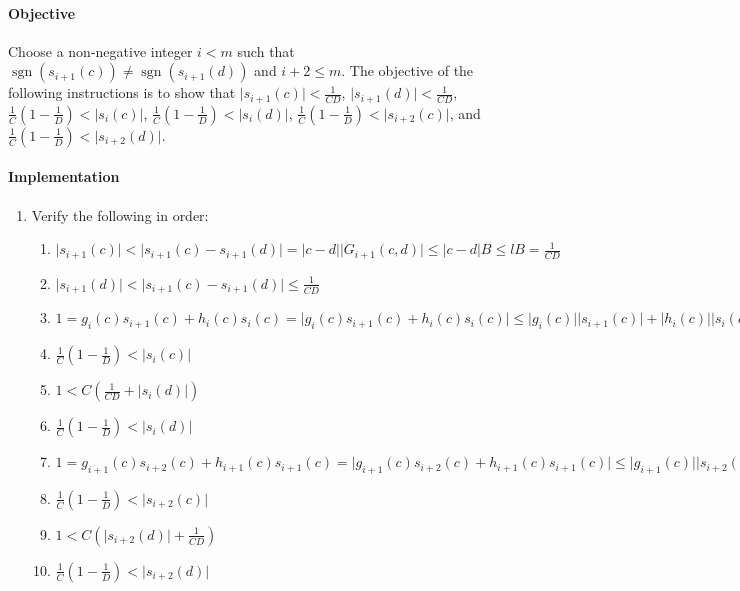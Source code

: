 \documentclass[twocolumn]{article}
\DeclareMathOperator{\sgn}{sgn}
\begin{document}
				\paragraph{Objective}
					Choose a non-negative integer $i<m$ such that $\sgn(s_{i+1}(c))\ne\sgn(s_{i+1}(d))$ and $i+2\le m$. The objective of the following instructions is to show that $\lvert s_{i+1}(c)\rvert<\frac{1}{CD}$, $\lvert s_{i+1}(d)\rvert<\frac{1}{CD}$, $\frac{1}{C}(1-\frac{1}{D})<\lvert s_{i}(c)\rvert$, $\frac{1}{C}(1-\frac{1}{D})<\lvert s_{i}(d)\rvert$, $\frac{1}{C}(1-\frac{1}{D})<\lvert s_{i+2}(c)\rvert$, and $\frac{1}{C}(1-\frac{1}{D})<\lvert s_{i+2}(d)\rvert$.
				\paragraph{Implementation}
					\begin{enumerate}
						\item Verify the following in order:
						\begin{enumerate}
							\item $\lvert s_{i+1}(c)\rvert<\lvert s_{i+1}(c)-s_{i+1}(d)\rvert=\lvert c-d\rvert\lvert G_{i+1}(c,d)\rvert\le\lvert c-d\rvert B\le lB=\frac{1}{CD}$
							\item $\lvert s_{i+1}(d)\rvert<\lvert s_{i+1}(c)-s_{i+1}(d)\rvert\le\frac{1}{CD}$
							\item $1=g_{i}(c)s_{i+1}(c)+h_{i}(c)s_{i}(c)=\lvert g_{i}(c)s_{i+1}(c)+h_{i}(c)s_{i}(c)\rvert\le\lvert g_{i}(c)\rvert\lvert s_{i+1}(c)\rvert+\lvert h_{i}(c)\rvert\lvert s_{i}(c)\rvert<C(\frac{1}{CD}+\lvert s_{i}(c)\rvert)$
							\item $\frac{1}{C}(1-\frac{1}{D})<\lvert s_{i}(c)\rvert$
							\item $1<C(\frac{1}{CD}+\lvert s_{i}(d)\rvert)$
							\item $\frac{1}{C}(1-\frac{1}{D})<\lvert s_{i}(d)\rvert$
							\item $1=g_{i+1}(c)s_{i+2}(c)+h_{i+1}(c)s_{i+1}(c)=\lvert g_{i+1}(c)s_{i+2}(c)+h_{i+1}(c)s_{i+1}(c)\rvert\le\lvert g_{i+1}(c)\rvert\lvert s_{i+2}(c)\rvert+\lvert h_{i+1}(c)\rvert\lvert s_{i+1}(c)\rvert<C(\lvert s_{i+2}(c)\rvert+\frac{1}{CD})$
							\item $\frac{1}{C}(1-\frac{1}{D})<\lvert s_{i+2}(c)\rvert$
							\item $1<C(\lvert s_{i+2}(d)\rvert+\frac{1}{CD})$
							\item $\frac{1}{C}(1-\frac{1}{D})<\lvert s_{i+2}(d)\rvert$
						\end{enumerate}
					\end{enumerate}
\end{document}
